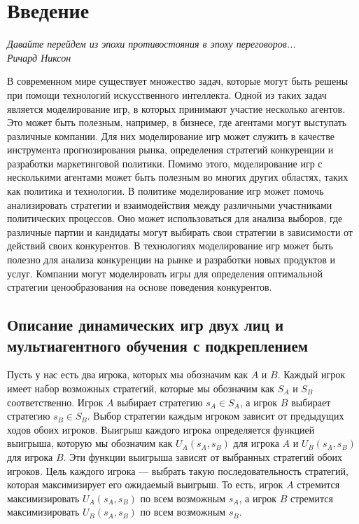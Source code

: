 \chapter{Введение}

\begin{flushright}
\fontsize{10}{12}\selectfont
\textit{Давайте перейдем из эпохи противостояния в эпоху переговоров...}\\
\textit{Ричард Никсон}
\end{flushright}

\label{sec:Chapter0} 


В современном мире существует множество задач, которые могут быть решены при помощи технологий искусственного интеллекта. Одной из таких задач является моделирование игр, в которых принимают участие несколько агентов. Это может быть полезным, например, в бизнесе, где агентами могут выступать различные компании. Для них моделирование игр может служить в качестве инструмента прогнозирования рынка, определения стратегий конкуренции и разработки маркетинговой политики. Помимо этого, моделирование игр с несколькими агентами может быть полезным во многих других областях, таких как политика и технологии. В политике моделирование игр может помочь анализировать стратегии и взаимодействия между различными участниками политических процессов. Оно может использоваться для анализа выборов, где различные партии и кандидаты могут выбирать свои стратегии в зависимости от действий своих конкурентов. В технологиях моделирование игр может быть полезно для анализа конкуренции на рынке и разработки новых продуктов и услуг. Компании могут моделировать игры для определения оптимальной стратегии ценообразования на основе поведения конкурентов.


\section{Описание динамических игр двух лиц и мультиагентного обучения с подкреплением}

Пусть у нас есть два игрока, которых мы обозначим как \(A\) и \(B\). Каждый игрок имеет набор возможных стратегий, которые мы обозначим как \(S_A\) и \(S_B\) соответственно. Игрок \(A\) выбирает стратегию \(s_A \in S_A\), а игрок \(B\) выбирает стратегию \(s_B \in S_B\). Выбор стратегии каждым игроком зависит от предыдущих ходов обоих игроков. Выигрыш каждого игрока определяется функцией выигрыша, которую мы обозначим как \(U_A(s_A, s_B)\) для игрока \(A\) и \(U_B(s_A, s_B)\) для игрока \(B\). Эти функции выигрыша зависят от выбранных стратегий обоих игроков. Цель каждого игрока --- выбрать такую последовательность стратегий, которая максимизирует его ожидаемый выигрыш. То есть, игрок \(A\) стремится максимизировать \(U_A(s_A, s_B)\) по всем возможным \(s_A\), а игрок \(B\) стремится максимизировать \(U_B(s_A, s_B)\) по всем возможным \(s_B\).

